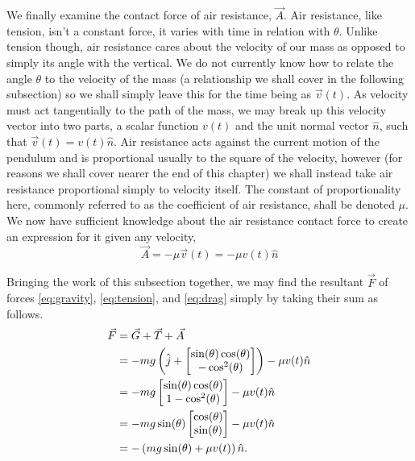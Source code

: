 \documentclass{article}
\begin{document}
We finally examine the contact force of air resistance, $\vec{A}$. Air resistance, like tension, isn't a constant force, it varies with time in relation with $\theta$. Unlike tension though, air resistance cares about the velocity of our mass as opposed to simply its angle with the vertical. We do not currently know how to relate the angle $\theta$ to the velocity of the mass (a relationship we shall cover in the following subsection) so we shall simply leave this for the time being as $\vec{v}(t)$. As velocity must act tangentially to the path of the mass, we may break up this velocity vector into two parts, a scalar function $v(t)$ and the unit normal vector $\hat{n}$, such that $\vec{v}(t) = v(t)\hat{n}$. Air resistance acts against the current motion of the pendulum and is proportional usually to the square of the velocity, however (for reasons we shall cover nearer the end of this chapter) we shall instead take air resistance proportional simply to velocity itself. The constant of proportionality here, commonly referred to as the coefficient of air resistance, shall be denoted $\mu$. We now have sufficient knowledge about the air resistance contact force to create an expression for it given any velocity,
\begin{equation} \label{eq:drag}
	\vec{A} = -\mu\vec{v}(t) = -\mu v(t) \hat{n}
\end{equation}

Bringing the work of this subsection together, we may find the resultant $\vec{F}$ of forces \eqref{eq:gravity}, \eqref{eq:tension}, and \eqref{eq:drag} simply by taking their sum as follows.
\begin{align}
	\vec{F} &= \vec{G} + \vec{T} + \vec{A} \notag \\
	&= -mg\left(\hat{j} +
	\begin{bmatrix}
		\sin(\theta)\cos(\theta) \\
		-\cos^2(\theta)
	\end{bmatrix}
	\right) - \mu v(t) \hat{n} \notag \\
	&= -mg
	\begin{bmatrix}
		\sin(\theta)\cos(\theta) \\
		1 - \cos^2(\theta)
	\end{bmatrix}
	-\mu v(t) \hat{n} \notag \\
	&= -mg\sin(\theta)
	\begin{bmatrix}
		\cos(\theta) \\
		\sin(\theta)
	\end{bmatrix}
	-\mu v(t) \hat{n} \notag \\
	&= -\left(mg\sin(\theta) + \mu v(t)\right)\hat{n}. \label{eq:resVector}
\end{align}
\end{document}
